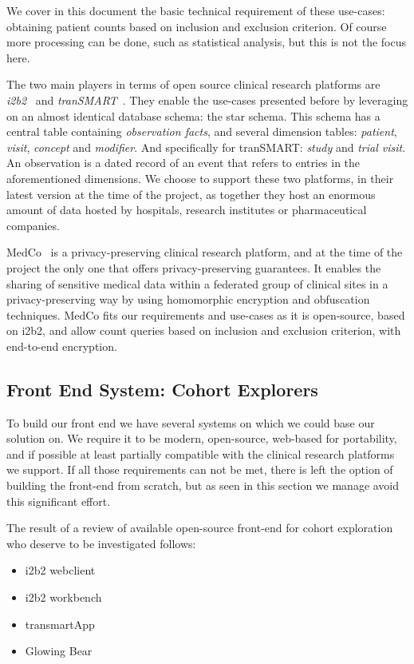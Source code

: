 We cover in this document the basic technical requirement of these use-cases: obtaining patient counts based on inclusion and exclusion criterion.
Of course more processing can be done, such as statistical analysis, but this is not the focus here.

The two main players in terms of open source clinical research platforms are \emph{i2b2}~\cite{todo} and \emph{tranSMART}~\cite{todo}.
They enable the use-cases presented before by leveraging on an almost identical database schema: the star schema. 
This schema has a central table containing \emph{observation facts}, and several dimension tables: \emph{patient}, \emph{visit}, \emph{concept} and \emph{modifier}.
And specifically for tranSMART: \emph{study} and \emph{trial visit}.
An observation is a dated record of an event that refers to entries in the aforementioned dimensions.
We choose to support these two platforms, in their latest version at the time of the project, as together they host an enormous amount of data hosted by hospitals, research institutes or pharmaceutical companies.

MedCo~\cite{todo} is a privacy-preserving clinical research platform, and at the time of the project the only one that offers privacy-preserving guarantees.
It enables the sharing of sensitive medical data within a federated group of clinical sites in a privacy-preserving way by using homomorphic encryption and obfuscation techniques.
MedCo fits our requirements and use-cases as it is open-source, based on i2b2, and allow count queries based on inclusion and exclusion criterion, with end-to-end encryption.


\subsection{Front End System: Cohort Explorers}

To build our front end we have several systems on which we could base our solution on.
We require it to be modern, open-source, web-based for portability, and if possible at least partially compatible with the clinical research platforms we support.
If all those requirements can not be met, there is left the option of building the front-end from scratch, but as seen in this section we manage avoid this significant effort.

The result of a review of available open-source front-end for cohort exploration who deserve to be investigated follows:
\begin{itemize}
    \item i2b2 webclient~\cite{todo}
    \item i2b2 workbench~\cite{todo}
    \item transmartApp~\cite{todo}
    \item Glowing Bear~\cite{todo}
\end{itemize}

